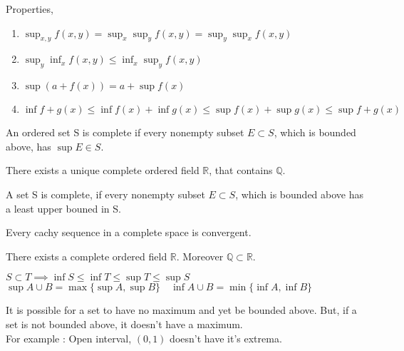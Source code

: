 	\begin{remark}Properties,
		\begin{enumerate}
			\item $\sup_{x,y} f(x,y) = \sup_x \sup_y f(x,y) = \sup_y \sup_x f(x,y)$
			\item $\sup_y \inf_x f(x,y) \le \inf_x \sup_y f(x,y)$
			\item $\sup (a + f(x)) = a + \sup f(x)$
			\item $\inf f+g (x) \le \inf f(x) + \inf g(x) \le \sup f(x) + \sup g(x) \le \sup f+g (x)$
		\end{enumerate}
	\end{remark}

	\begin{definition}
		An ordered set S is complete if every nonempty subset $E \subset S$, which is bounded above, has $\sup E \in S$.
	\end{definition}

	\begin{theorem}
		There exists a unique complete ordered field $\mathbb{R}$, that contains $\mathbb{Q}$.
	\end{theorem}

	\begin{axiom}[Completeness]
		A set S is complete, if every nonempty subset $E \subset S$,
		which is bounded above has a least upper bouned in S.
	\end{axiom}

	\begin{remark}
		Every cachy sequence in a complete space is convergent.
	\end{remark}

	\begin{theorem}
		There exists a complete ordered field $\mathbb{R}$. Moreover $\mathbb{Q} \subset \mathbb{R}$.
	\end{theorem}

	\begin{remark}
		$S\subset T \implies \inf S \le \inf T \le \sup T \le \sup S$\\
		$\sup A \cup B = \max\{\sup A,\sup B\} \quad \inf A\cup B = \min\{\inf A,\inf B\}$
	\end{remark}

	\begin{remark}
		It is possible for a set to have no maximum and yet be bounded above. But, if a set is not bounded above, it doesn't have a maximum.\\
		For example : Open interval, $(0,1)$ doesn't have it's extrema.
	\end{remark}

